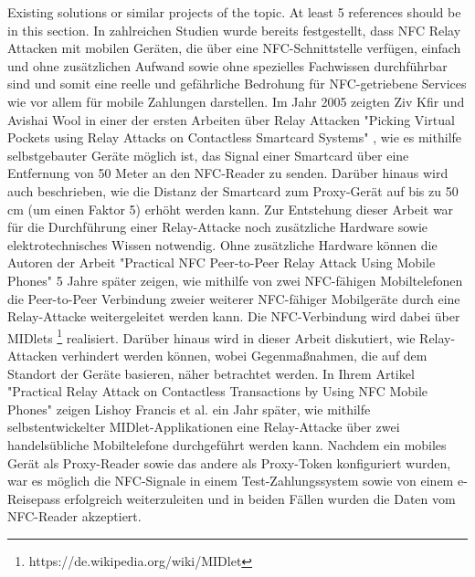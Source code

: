 \documentclass[a4paper,10pt,ngerman]{INSOexpose}
\begin{document}
\langchooser
{
	Existing solutions or similar projects of the topic. At least 5 references should be in this section.
}
{
	In zahlreichen Studien wurde bereits festgestellt, dass NFC Relay Attacken mit mobilen Geräten, die über eine NFC-Schnittstelle verfügen, einfach und ohne zusätzlichen Aufwand sowie ohne spezielles Fachwissen durchführbar sind und somit eine reelle und gefährliche Bedrohung für NFC-getriebene Services wie vor allem für mobile Zahlungen darstellen. 
	Im Jahr 2005 zeigten Ziv Kfir und Avishai Wool in einer der ersten Arbeiten über Relay Attacken \cite{practicalExperiencesNfcRelayAndroid} "Picking Virtual Pockets using Relay Attacks on Contactless Smartcard Systems" \cite{pickingVirtualPockets}, wie es mithilfe selbstgebauter Geräte möglich ist, das Signal einer Smartcard über eine Entfernung von 50 Meter an den NFC-Reader zu senden. Darüber hinaus wird auch beschrieben, wie die Distanz der Smartcard zum Proxy-Gerät auf bis zu 50 cm (um einen Faktor 5) erhöht werden kann. Zur Entstehung dieser Arbeit war für die Durchführung einer Relay-Attacke noch zusätzliche Hardware sowie elektrotechnisches Wissen notwendig.
	\newline
	Ohne zusätzliche Hardware können die Autoren der Arbeit "Practical NFC Peer-to-Peer Relay Attack Using Mobile Phones" \cite{practicalNfcPeerToPeerRelayMobilePhones} 5 Jahre später zeigen, wie mithilfe von zwei NFC-fähigen Mobiltelefonen die Peer-to-Peer Verbindung zweier weiterer NFC-fähiger Mobilgeräte durch eine Relay-Attacke weitergeleitet werden kann. Die NFC-Verbindung wird dabei über MIDlets \footnote{https://de.wikipedia.org/wiki/MIDlet} realisiert. Darüber hinaus wird in dieser Arbeit diskutiert, wie Relay-Attacken verhindert werden können, wobei Gegenmaßnahmen, die auf dem Standort der Geräte basieren, näher betrachtet werden. 
	\newline
	In Ihrem Artikel "Practical Relay Attack on Contactless Transactions by Using NFC Mobile Phones" \cite{practicalRelayContactlessTransactions} zeigen Lishoy Francis et al. ein Jahr später, wie mithilfe selbstentwickelter MIDlet-Applikationen eine Relay-Attacke über zwei handelsübliche Mobiltelefone durchgeführt werden kann. Nachdem ein mobiles Gerät als Proxy-Reader sowie das andere als Proxy-Token konfiguriert wurden, war es möglich die NFC-Signale in einem Test-Zahlungssystem sowie von einem e-Reisepass erfolgreich weiterzuleiten und in beiden Fällen wurden die Daten vom NFC-Reader akzeptiert. 
	\newline
}
\end{document}
